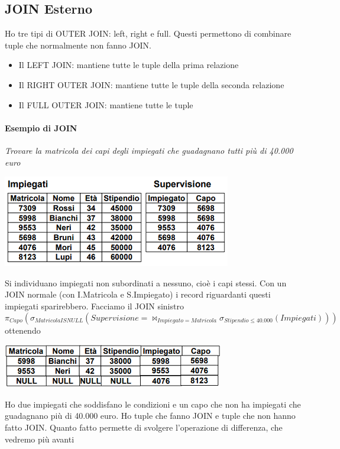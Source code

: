 \subsection{JOIN Esterno}
Ho tre tipi di OUTER JOIN: left, right e full. Questi permettono di combinare tuple che normalmente non fanno JOIN.
\begin{itemize}
	\item Il LEFT JOIN: mantiene tutte le tuple della prima relazione
	\item Il RIGHT OUTER JOIN: mantiene tutte le tuple della seconda relazione
	\item Il FULL OUTER JOIN: mantiene tutte le tuple
\end{itemize}
\paragraph{Esempio di JOIN} \emph{Trovare la matricola dei capi degli impiegati che guadagnano tutti più di 40.000 euro}
\begin{center}
	\includegraphics{images/60.PNG}
\end{center}
Si individuano impiegati non subordinati a nessuno, cioè i capi stessi. Con un JOIN normale (con I.Matricola e S.Impiegato) i record riguardanti questi impiegati sparirebbero. Facciamo il JOIN sinistro
\[\pi_{Capo}(\sigma_{Matricola IS NULL}(Supervisione = \Join_{Impiegato=Matricola} \sigma_{Stipendio \leq 40.000}(Impiegati)))\]
ottenendo
\begin{center}
	\includegraphics{images/61.PNG}
\end{center}
Ho due impiegati che soddisfano le condizioni e un capo che non ha impiegati che guadagnano più di 40.000 euro. Ho tuple che fanno JOIN e tuple che non hanno fatto JOIN. Quanto fatto permette di svolgere l'operazione di differenza, che vedremo più avanti
